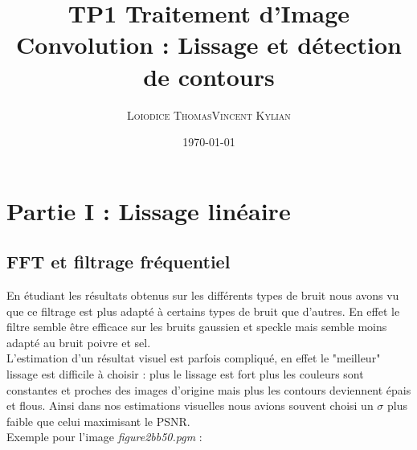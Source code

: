 \documentclass[a4,12pt]{article}
\title{\textbf{TP1 Traitement d'Image\\Convolution : Lissage et détection de contours}}
\author{
\begin{tabular}{cc}
	\textsc{Loiodice Thomas} & \textsc{Vincent Kylian} \\
\end{tabular}}
\date{\small \today}
\begin{document}
\maketitle



\section{Partie I : Lissage linéaire}

\subsection{FFT et filtrage fréquentiel}


En étudiant les résultats obtenus sur les différents types de bruit nous avons vu que ce filtrage est plus adapté à certains types de bruit que d'autres. En effet le filtre semble être efficace sur les bruits gaussien et speckle mais semble moins adapté au bruit poivre et sel.\\

L'estimation d'un résultat visuel est parfois compliqué, en effet le "meilleur" lissage est difficile à choisir : plus le lissage est fort plus les couleurs sont constantes et proches des images d'origine mais plus les contours deviennent épais et flous. Ainsi dans nos estimations visuelles nous avions souvent choisi un $\sigma$ plus faible que celui maximisant le PSNR.\\


Exemple pour l'image \textit{figure2bb50.pgm} :\\
\end{document}
